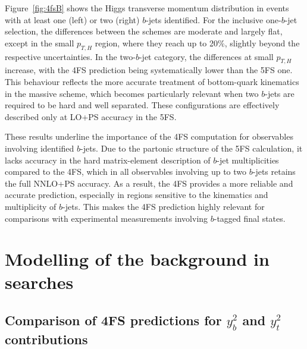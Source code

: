 \documentclass[11pt,a4paper]{article}
\begin{document}
Figure~\ref{fig:4fsB} shows the Higgs transverse momentum distribution in events with at least one (left) or two (right) $b$-jets identified. For the inclusive one-$b$-jet selection, the differences between the schemes are moderate and largely flat, except in the small $p_{T,H}$ region, where they reach up to 20\%, slightly beyond the respective uncertainties. 
In the two-$b$-jet category, the differences at small $p_{T,H}$ increase, with the 4FS prediction being systematically lower than the 5FS one. This behaviour reflects the more accurate treatment of bottom-quark kinematics in the massive scheme, which becomes particularly relevant when two $b$-jets are required to be hard and well separated. These configurations
are effectively described only at LO+PS accuracy in the 5FS.

These results underline the importance of the 4FS computation for observables involving identified $b$-jets. Due to the partonic structure of the 5FS calculation, it lacks accuracy in the hard matrix-element description of $b$-jet multiplicities compared to the 4FS, which in all observables involving up to two $b$-jets retains the full NNLO+PS accuracy. 
As a result, the 4FS provides a more reliable and accurate prediction, especially in regions sensitive to the kinematics and multiplicity of $b$-jets. This makes the 4FS prediction highly relevant for comparisons with experimental measurements involving $b$-tagged final states.


\section{Modelling of the  background in  searches}\label{sec:HH}

\subsection{Comparison of 4FS predictions for $y_b^2$ and $y_t^2$ contributions}
\end{document}
